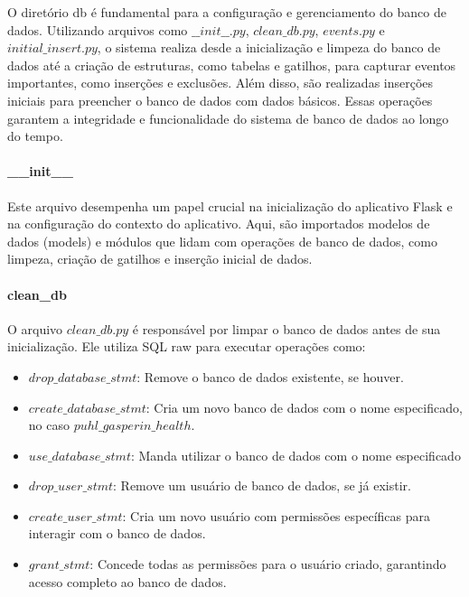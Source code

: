 \documentclass[conference, a4paper, 12pt]{IEEEtran}
\begin{document}
O diretório db é fundamental para a configuração e gerenciamento do banco de dados. Utilizando arquivos como $\_\_init\_\_.py$, $clean\_db.py$, $events.py$ e $initial\_insert.py$, o sistema realiza desde a inicialização e limpeza do banco de dados até a criação de estruturas, como tabelas e gatilhos, para capturar eventos importantes, como inserções e exclusões. Além disso, são realizadas inserções iniciais para preencher o banco de dados com dados básicos. Essas operações garantem a integridade e funcionalidade do sistema de banco de dados ao longo do tempo.

\paragraph{\_\_init\_\_}
Este arquivo desempenha um papel crucial na inicialização do aplicativo Flask e na configuração do contexto do aplicativo. Aqui, são importados modelos de dados (models) e módulos que lidam com operações de banco de dados, como limpeza, criação de gatilhos e inserção inicial de dados.

\paragraph{clean\_db}
O arquivo $clean\_db.py$ é responsável por limpar o banco de dados antes de sua inicialização. Ele utiliza SQL raw para executar operações como:
\begin{itemize}
    \item $drop\_database\_stmt$: Remove o banco de dados existente, se houver.
    \item $create\_database\_stmt$: Cria um novo banco de dados com o nome especificado, no caso $puhl\_gasperin\_health$.
    \item $use\_database\_stmt$: Manda utilizar o banco de dados com o nome especificado
    \item $drop\_user\_stmt$: Remove um usuário de banco de dados, se já existir.
    \item $create\_user\_stmt$: Cria um novo usuário com permissões específicas para interagir com o banco de dados.
    \item $grant\_stmt$: Concede todas as permissões para o usuário criado, garantindo acesso completo ao banco de dados.
\end{itemize}
\end{document}
